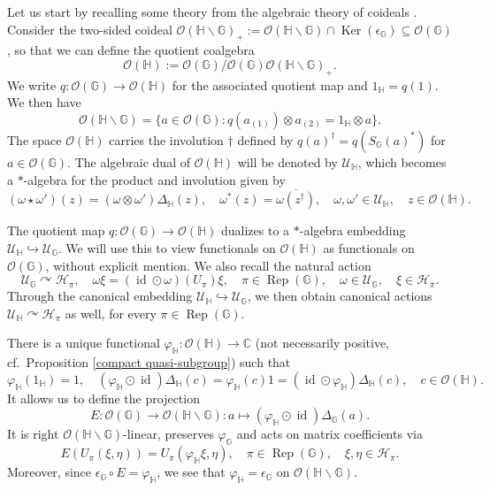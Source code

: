 \documentclass[reqno]{amsart}
\numberwithin{equation}{section}
\DeclareMathOperator{\id}{\mathrm{id}}
\DeclareMathOperator{\Rep}{\mathrm{Rep}}
\renewcommand{\H}{\mathbb{H}}
\newcommand{\mcH}{\mathcal{H}}
\newcommand{\mcO}{\mathcal{O}}
\newcommand{\C}{\mathbb{C}}
\newcommand{\G}{\mathbb{G}}
\begin{document}
Let us start by recalling some theory from the algebraic theory of coideals \cites{Ch18, DCDT24}. Consider the two-sided coideal $\mcO(\H\backslash \G)_+:= \mcO(\H\backslash \G)\cap \operatorname{Ker}(\epsilon_\G)\subseteq \mcO(\G)$, so that we can define the quotient coalgebra
$$\mcO(\H):= \mcO(\G)/\mcO(\G) \mcO(\H\backslash \G)_+.$$
We write $q: \mcO(\G)\to \mcO(\H)$ for the associated quotient map and $1_\H= q(1)$.
We then have
\begin{equation}\label{coidealreconstruction}
    \mcO(\H \backslash \G)= \{a\in \mcO(\G): q(a_{(1)})\otimes a_{(2)}= 1_\H \otimes a\}.
\end{equation}
The space $\mcO(\H)$ carries the involution $\dag$ defined by $q(a)^\dag = q(S_\G(a)^*)$ for $a\in \mcO(\G)$. The algebraic dual of $\mcO(\H)$ will be denoted by $\mathscr{U}_\H$, which becomes a $*$-algebra for the product and involution given by
$$(\omega \star \omega')(z)= (\omega \otimes \omega')\Delta_{\H}(z), \quad \omega^*(z)= \overline{\omega(z^\dag)}, \quad \omega, \omega'\in \mathscr{U}_{\H}, \quad z \in \mcO(\H).$$

The quotient map $q: \mcO(\G)\to \mcO(\H)$ dualizes to a $*$-algebra embedding
$\mathscr{U}_\H\hookrightarrow \mathscr{U}_\G.$ We will use this to view functionals on $\mcO(\H)$ as functionals on $\mcO(\G)$, without explicit mention.  We also recall the natural action
$$\mathscr{U}_{\G}\curvearrowright \mcH_\pi,  \quad \omega \xi = (\id \odot \omega)(U_\pi)\xi,  \quad \pi \in \Rep(\G), \quad \omega \in \mathscr{U}_\G, \quad \xi \in \mcH_\pi.$$
Through the canonical embedding $\mathscr{U}_\H\hookrightarrow \mathscr{U}_\G$, we then obtain canonical actions $\mathscr{U}_\H\curvearrowright \mcH_\pi$ as well, for every $\pi \in \Rep(\G)$.

There is a unique functional $\varphi_\H: \mcO(\H)\to \C$ (not necessarily positive, cf.\ Proposition \ref{compact quasi-subgroup}) such that 
\begin{equation}\label{invariance}
    \varphi_\H(1_\H)= 1, \quad (\varphi_\H \odot \id)\Delta_\H(c) = \varphi_\H(c) 1= (\id \odot \varphi_\H)\Delta_\H(c), \quad c \in \mcO(\H).
\end{equation}
It allows us to define the projection
\begin{equation}\label{expectation}
    E: \mcO(\G)\to \mcO(\H \backslash \G): a \mapsto (\varphi_\H  \odot \id)\Delta_\G(a).
\end{equation}
It is right $\mcO(\H\backslash \G)$-linear, preserves $\varphi_\G$ and acts on matrix coefficients via
\begin{equation}
    \label{expmat} E(U_\pi(\xi, \eta)) = U_\pi(\varphi_\H\xi, \eta), \quad \pi\in \Rep(\G), \quad \xi, \eta \in \mcH_\pi.
\end{equation}
Moreover, since $\epsilon_\G\circ E = \varphi_\H$, we see that $\varphi_\H= \epsilon_\G$ on $\mcO(\H\backslash \G)$.
\end{document}
